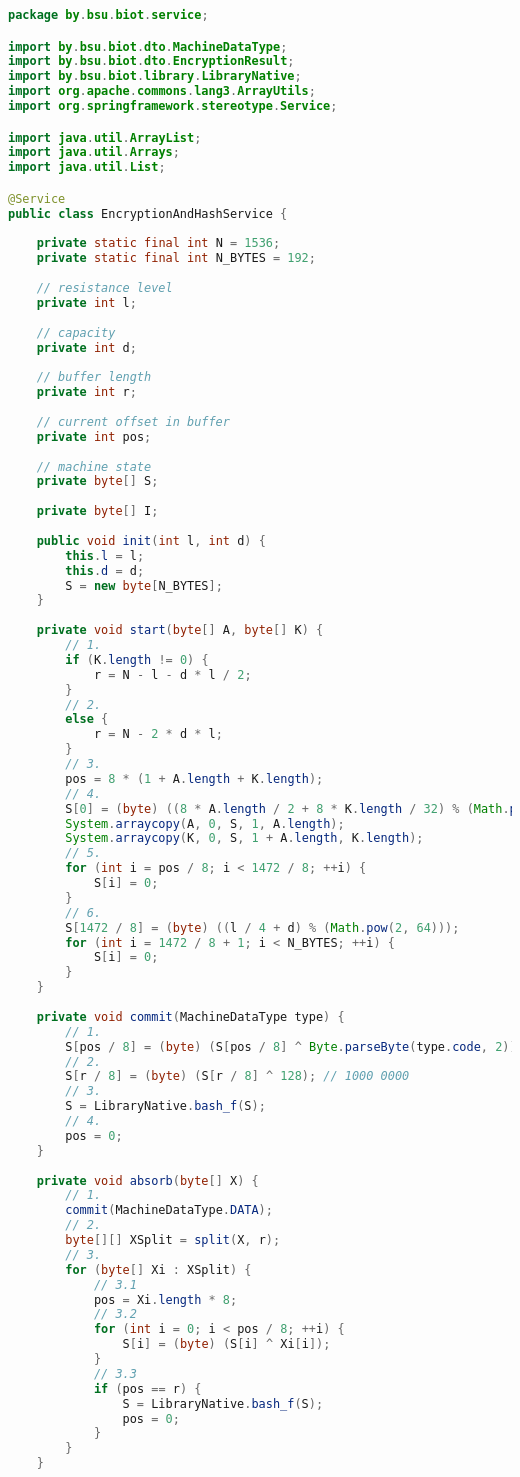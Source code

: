 
\begin{lstlisting}[language=Java,label=encr-code-java]
package by.bsu.biot.service;

import by.bsu.biot.dto.MachineDataType;
import by.bsu.biot.dto.EncryptionResult;
import by.bsu.biot.library.LibraryNative;
import org.apache.commons.lang3.ArrayUtils;
import org.springframework.stereotype.Service;

import java.util.ArrayList;
import java.util.Arrays;
import java.util.List;

@Service
public class EncryptionAndHashService {
	
	private static final int N = 1536;
	private static final int N_BYTES = 192;
	
	// resistance level
	private int l;
	
	// capacity
	private int d;
	
	// buffer length
	private int r;
	
	// current offset in buffer
	private int pos;
	
	// machine state
	private byte[] S;
	
	private byte[] I;
	
	public void init(int l, int d) {
		this.l = l;
		this.d = d;
		S = new byte[N_BYTES];
	}
	
	private void start(byte[] A, byte[] K) {
		// 1.
		if (K.length != 0) {
			r = N - l - d * l / 2;
		}
		// 2.
		else {
			r = N - 2 * d * l;
		}
		// 3.
		pos = 8 * (1 + A.length + K.length);
		// 4.
		S[0] = (byte) ((8 * A.length / 2 + 8 * K.length / 32) % (Math.pow(2, 8)));
		System.arraycopy(A, 0, S, 1, A.length);
		System.arraycopy(K, 0, S, 1 + A.length, K.length);
		// 5.
		for (int i = pos / 8; i < 1472 / 8; ++i) {
			S[i] = 0;
		}
		// 6.
		S[1472 / 8] = (byte) ((l / 4 + d) % (Math.pow(2, 64)));
		for (int i = 1472 / 8 + 1; i < N_BYTES; ++i) {
			S[i] = 0;
		}
	}
	
	private void commit(MachineDataType type) {
		// 1.
		S[pos / 8] = (byte) (S[pos / 8] ^ Byte.parseByte(type.code, 2));
		// 2.
		S[r / 8] = (byte) (S[r / 8] ^ 128); // 1000 0000
		// 3.
		S = LibraryNative.bash_f(S);
		// 4.
		pos = 0;
	}
	
	private void absorb(byte[] X) {
		// 1.
		commit(MachineDataType.DATA);
		// 2.
		byte[][] XSplit = split(X, r);
		// 3.
		for (byte[] Xi : XSplit) {
			// 3.1
			pos = Xi.length * 8;
			// 3.2
			for (int i = 0; i < pos / 8; ++i) {
				S[i] = (byte) (S[i] ^ Xi[i]);
			}
			// 3.3
			if (pos == r) {
				S = LibraryNative.bash_f(S);
				pos = 0;
			}
		}
	}
	

\end{lstlisting}
